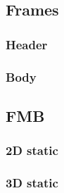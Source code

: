 \documentclass[12pt, a4paper]{article}
\begin{document}
\subsection{Frames}

\subsubsection{Header}

\begin{scriptsize}
\begin{ttfamily}

\end{ttfamily}
\end{scriptsize}

\subsubsection{Body}

\begin{scriptsize}
\begin{ttfamily}

\end{ttfamily}
\end{scriptsize}

\subsection{FMB}

\subsubsection{2D static}


\begin{scriptsize}
\begin{ttfamily}

\end{ttfamily}
\end{scriptsize}


\begin{scriptsize}
\begin{ttfamily}

\end{ttfamily}
\end{scriptsize}

\subsubsection{3D static}
\end{document}
